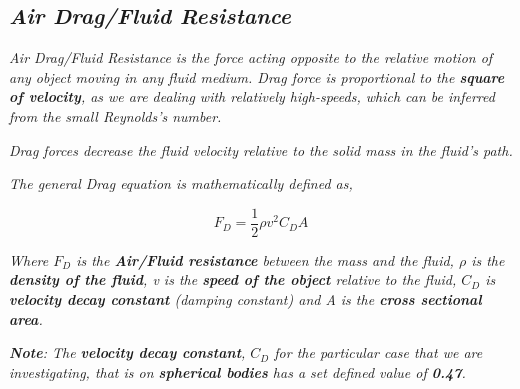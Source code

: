         
        
        
\subsection{\textit{Air Drag/Fluid Resistance}}
        
    \textit{Air Drag/Fluid Resistance is the force acting opposite to the relative motion of any object moving in any fluid medium. Drag force is proportional to the \textbf{square of velocity}, as we are dealing with relatively high-speeds, which can be inferred from the small Reynolds's number.}
            
    \textit{Drag forces decrease the fluid velocity relative to the solid mass in the fluid's path.}
            
            
    \textit{The general Drag equation is mathematically defined as,}
            
        $$F_D = \frac{1}{2}\rho v^2C_DA$$
           
    \textit{Where $F_D$ is the \textbf{Air/Fluid resistance} between the mass and the fluid, $\rho$ is the \textbf{density of the fluid}, v is the \textbf{speed of the object} relative to the fluid, $C_D$ is \textbf{velocity decay constant} (damping constant) and A is the \textbf{cross sectional area}.}
            
    \textit{\textbf{Note}: The\textbf{ velocity decay constant}, $C_D$ for the particular case that we are investigating, that is on \textbf{spherical bodies} has a set defined value of \textbf{0.47}.}
            
            
